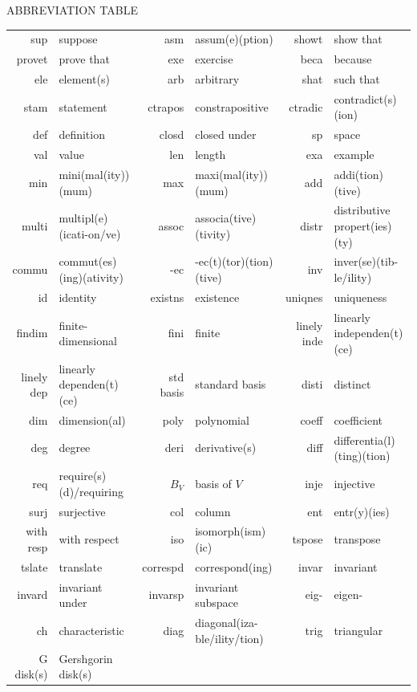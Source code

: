 {\begin{center}
\vspace{14pt}
{\large A{\footnotesize BBREVIATION} T{\footnotesize ABLE}}\vspace{8pt}\par
\begin{tabularx}{1.00\textwidth}{
		  r |
		| >{\raggedright\arraybackslash}X | r |
		| >{\raggedright\arraybackslash}X | r |
		| >{\raggedright\arraybackslash}X }
	\hline
sup&			suppose							& asm&			assum(e)(ption)						& showt&			show that\\
provet&			prove that						& exe&			exercise							& beca&				because\\
ele&			element(s)						& arb&			arbitrary							& shat&				such that\\
stam&			statement						& ctrapos&		constrapositive						& ctradic&			contradict(s)(ion)\\
def&			definition						& closd&		closed under						& sp&				space\\
val&			value							& len&			length								& exa&				example\\
min&			mini(mal(ity))(mum)				& max&			maxi(mal(ity))(mum)					& add&				addi(tion)(tive)\\
multi&			multipl(e)(icati-on/ve)	& assoc&		associa(tive)(tivity)				& distr&			distributive propert(ies)(ty)\\
commu&			commut(es)(ing)(ativity)		& -ec&			-ec(t)(tor)(tion)(tive)				& inv&				inver(se)(tib-le/ility)\\
id&				identity						& existns&		existence							& uniqnes&			uniqueness\\
findim&			finite-dimensional				& fini&			finite								& linely inde&		linearly independen(t)(ce)\\
linely dep&	linearly dependen(t)(ce)			& std basis&	standard basis						& disti&			distinct\\
dim&			dimension(al)					& poly&			polynomial							& coeff&			coefficient\\
deg&			degree							& deri&			derivative(s)						& diff&				differentia(l)(ting)(tion)\\
req&			require(s)(d)/requiring			& $B_V$&		basis of $V$						& inje&				injective\\
surj&			surjective						& col&			column								& ent&				entr(y)(ies)\\
with resp&		with respect					& iso&			isomorph(ism)(ic)					& tspose&			transpose\\
tslate&			translate						& correspd&		correspond(ing)						& invar&			invariant\\
invard&			invariant under					& invarsp&		invariant subspace					& eig-&				eigen-\\
ch&				characteristic					& diag&			diagonal(iza-ble/ility/tion)		& trig&				triangular\\
G disk(s)&		Gershgorin disk(s)				& &\\
\hline
\end{tabularx}
\end{center}

\clearpage
}{}

\begin{large}




\end{large}


